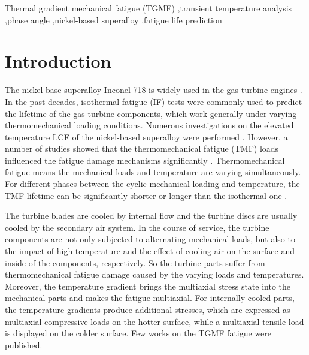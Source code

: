\documentclass[preprint,5p,twocolumn,10pt,sort&compress]{elsarticle}
\begin{document}
\begin{frontmatter}
%
\begin{keyword}
Thermal gradient mechanical fatigue (TGMF) \sep transient temperature analysis \sep phase angle \sep nickel-based superalloy \sep fatigue life prediction

\end{keyword}
\end{frontmatter}

\section{Introduction}

The nickel-base superalloy Inconel 718 is widely used in the gas turbine engines \cite{Pollock2006}. In the past decades, isothermal fatigue (IF) tests were commonly used to predict the lifetime of the gas turbine components, which work generally under varying thermomechanical loading conditions. Numerous investigations on the elevated temperature LCF of the nickel-based superalloy were performed \cite{Koch85, Morrow88, Mahobia2014, Chen2016}. However, a number of studies showed that the thermomechanical fatigue (TMF) loads influenced the fatigue damage mechanisms significantly \cite{Evans2008, Bauer2009, Kulawinski2015, SCHLESINGER2017242, DENG2019813}. Thermomechanical fatigue means the mechanical loads and temperature are varying simultaneously. For different phases between the cyclic mechanical loading and temperature, the TMF lifetime can be significantly shorter or longer than the isothermal one \cite{SUN2019228}.

The turbine blades are cooled by internal flow and the turbine discs are usually cooled by the secondary air system.
In the course of service, the turbine components are not only subjected to alternating mechanical loads, but also to the impact of high temperature and the effect of cooling air on the surface and inside of the components, respectively. So the turbine parts suffer from thermomechanical fatigue damage caused by the varying loads and temperatures.
Moreover, the temperature gradient brings the multiaxial stress state into the mechanical parts and makes the fatigue multiaxial.
For internally cooled parts, the temperature gradients produce additional stresses, which are expressed as multiaxial compressive loads on the hotter surface, while a multiaxial tensile load is displayed on the colder surface.
Few works on the TGMF fatigue were published.
\end{document}
